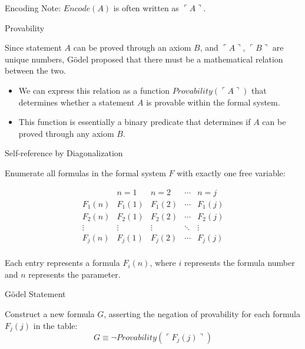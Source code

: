 \documentclass[final]{beamer}
\newlength{\colwidth}
\begin{document}
\begin{frame}[t]
\begin{columns}[t]
\begin{column}{\colwidth}
\begin{block}{Encoding}
    Note: $Encode(A)$ is often written as $\ulcorner \!A \urcorner$.

  \end{block}


 \begin{block}{Provability}

Since statement $A$ can be proved through an axiom $B$, and $\ulcorner \!A \urcorner$, $\ulcorner \!B \urcorner$ are unique numbers, Gödel proposed that there must be a mathematical relation between the two.

 \begin{itemize}
    
    \item We can express this relation as a function $Provability(\ulcorner \!A \urcorner)$ that determines whether a statement $A$ is provable within the formal system.
    
    \item This function is essentially a binary predicate that determines if $A$ can be proved through any axiom $B$.
    
    \end{itemize}

 \end{block}


 \begin{block}{Self-reference by Diagonalization}

    Enumerate all formulas in the formal system $F$ with exactly one free variable:
    
    \[
    \begin{array}{c|c|c|c|c}
    & n=1 & n=2 & \cdots & n = j \\
    \hline
    F_1(n) & F_1(1) & F_1(2) & \cdots & F_1(j) \\
    F_2(n) & F_2(1) & F_2(2) & \cdots & F_2(j) \\
    \vdots & \vdots & \vdots & \ddots & \vdots \\
    F_j(n) & F_j(1) & F_j(2) & \cdots & F_j(j) \\
    \end{array}
    \]


Each entry represents a formula \( F_i(n) \), where \( i \) represents the formula number and \( n \) represents the parameter.
\end{block}


\begin{alertblock}{Gödel Statement}

Construct a new formula $G$, asserting the negation of provability for each formula $F_j(j)$ in the table:
$$G \equiv \neg Provability(\ulcorner F_j(j)\urcorner)$$
 \end{alertblock}


\end{column}
\end{columns}
\end{frame}
\end{document}
